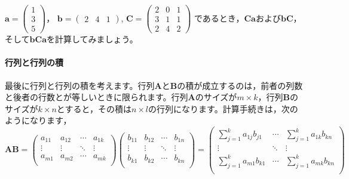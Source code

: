 \documentclass{ltjsbook}
\begin{document}
\begin{reidai}{}{}

    $\bm{a} = \begin{pmatrix} 1  \\ 3 \\ 5 \end{pmatrix}$，
    $\bm{b} = \begin{pmatrix} 2 & 4 & 1\end{pmatrix}$,
    $\bm{C} = \begin{pmatrix} 2 & 0 & 1 \\ 3 & 1 & 1 \\ 2 & 4 & 2 \end{pmatrix}$
    であるとき，$\bm{Ca}$および$\bm{bC}$，そして$\bm{bCa}$を計算してみましょう。

\end{reidai}

\paragraph{行列と行列の積}
最後に行列と行列の積を考えます。行列$\bm{A}$と$\bm{B}$の積が成立するのは，前者の列数と後者の行数とが等しいときに限られます。行列$\bm{A}$のサイズが$m \times k$，行列$\bm{B}$のサイズが$k \times n$とすると，その積は$n \times l$の行列になります。計算手続きは，次のようになります，
\begin{equation*}
    \bm{A} \bm{B} =
    \begin{pmatrix}
        a_{11} & a_{12} & \cdots & a_{1k} \\
        \vdots & \vdots & \ddots & \vdots \\
        a_{m1} & a_{m2} & \cdots & a_{mk} \\
    \end{pmatrix}
    \begin{pmatrix}
        b_{11} & b_{12} & \cdots & b_{1n} \\
        \vdots & \vdots & \ddots & \vdots \\
        b_{k1} & b_{k2} & \cdots & b_{kn} \\
    \end{pmatrix}
    =
    \begin{pmatrix}
        \sum_{j=1}^{k} a_{1j} b_{j1} & \cdots & \sum_{j=1}^{k} a_{1k} b_{kn} \\
        \vdots                       & \ddots & \vdots                       \\
        \sum_{j=1}^{k} a_{m1} b_{k1} & \cdots & \sum_{j=1}^{k} a_{mk} b_{kn} \\
    \end{pmatrix}
\end{equation*}
\end{document}

